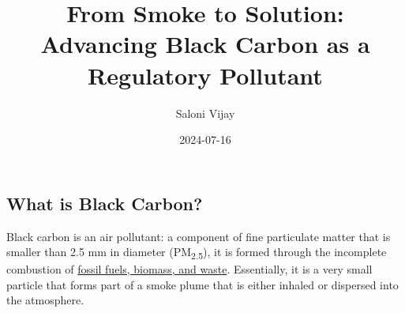 \documentclass[
  letterpaper,
  DIV=11,
  numbers=noendperiod]{scrartcl}
\title{From Smoke to Solution: Advancing Black Carbon as a Regulatory
Pollutant}
\author{Saloni Vijay}
\date{2024-07-16}
\renewcommand*\contentsname{Table of contents}
\newcommand\contentsname{Table of contents}
\begin{document}
\maketitle

\renewcommand*\contentsname{Table of contents}
{
\hypersetup{linkcolor=}
\setcounter{tocdepth}{3}
\tableofcontents
}
\href{https://creativecommons.org/licenses/by/4.0/}{}
\href{https://doi.org/10.5281/zenodo.12705811}{}

\subsection{What is Black Carbon?}\label{what-is-black-carbon}

Black carbon is an air pollutant: a component of fine particulate matter
that is smaller than 2.5 mm in diameter (PM\textsubscript{2.5}), it is
formed through the incomplete combustion of
\href{https://www.ccacoalition.org/short-lived-climate-pollutants/black-carbon}{fossil
fuels, biomass, and waste}. Essentially, it is a very small particle
that forms part of a smoke plume that is either inhaled or dispersed
into the atmosphere.
\end{document}
